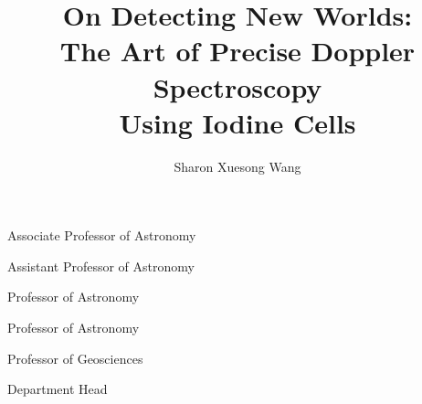 \documentclass[11pt]{psuthesis}
\begin{document}
\title{On Detecting New Worlds: \\
  The Art of Precise Doppler Spectroscopy \\
  Using Iodine Cells}
\author{Sharon Xuesong Wang}


\begin{singlespace}

        {Associate Professor of Astronomy}

          {Assistant Professor of Astronomy}

          {Professor of Astronomy}

            {Professor of Astronomy}

           {Professor of Geosciences}

           {Department Head}

\begin{frontmatter}


\begin{doublespace}

\frontmatter
\psutitlepage
\psucommitteepage
{}
\thesistableofcontents
\thesislistoffigures
\thesislistoftables
\end{doublespace}


\clearpage
{}
\end{frontmatter}

\thesismainmatter
\allowdisplaybreaks{







}


\backmatter



\pagebreak
{}
\end{singlespace}
\end{document}
